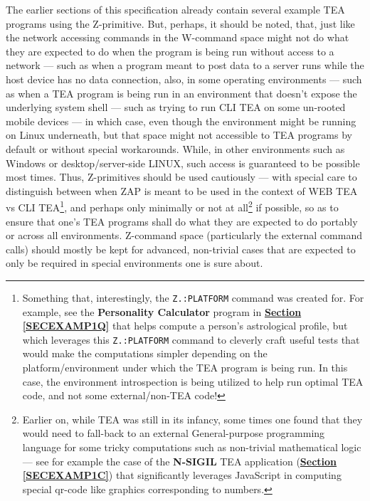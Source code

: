 \documentclass[a4paper, 18pt]{book} %
\begin{document}
{{{The earlier sections of this specification already contain several example TEA programs using the Z-primitive. But, perhaps, it should be noted, that, just like the network accessing commands in the W-command space might not do what they are expected to do when the program is being run without access to a network --- such as when a program meant to post data to a server runs while the host device has no data connection, also, in some operating environments --- such as when a TEA program is being run in an environment that doesn't expose the underlying system shell --- such as trying to run CLI TEA on some un-rooted mobile devices --- in which case, even though the environment might be running on Linux underneath, but that space might not accessible to TEA programs by default or without special workarounds. While, in other environments such as Windows or desktop/server-side LINUX, such access is guaranteed to be possible most times. Thus, Z-primitives should be used cautiously --- with special care to distinguish between when ZAP is meant to be used in the context of WEB TEA vs CLI TEA\footnote{Something that, interestingly, the \texttt{Z.:PLATFORM} command was created for. For example, see the \textbf{Personality Calculator} program in \textbf{\hyperref[SECEXAMP1Q]{Section \ref{SECEXAMP1Q}}} that helps compute a person's astrological profile, but which leverages this \texttt{Z.:PLATFORM} command to cleverly craft useful tests that would make the computations simpler depending on the platform/environment under which the TEA program is being run. In this case, the environment introspection is being utilized to help run optimal TEA code, and not some external/non-TEA code!}, and perhaps only minimally or not at all\footnote{Earlier on, while TEA was still in its infancy, some times one found that they would need to fall-back to an external General-purpose programming language for some tricky computations such as non-trivial mathematical logic --- see for example the case of the \textbf{N-SIGIL} TEA application (\textbf{\hyperref[SECEXAMP1C]{Section \ref{SECEXAMP1C}}}) that significantly leverages JavaScript in computing special qr-code like graphics corresponding to numbers.} if possible, so as to ensure that one's TEA programs shall do what they are expected to do portably or across all environments. Z-command space (particularly the external command calls) should mostly be kept for advanced, non-trivial cases that are expected to only be required in special environments one is sure about.

\vspace{2em}


}}}
\end{document}
